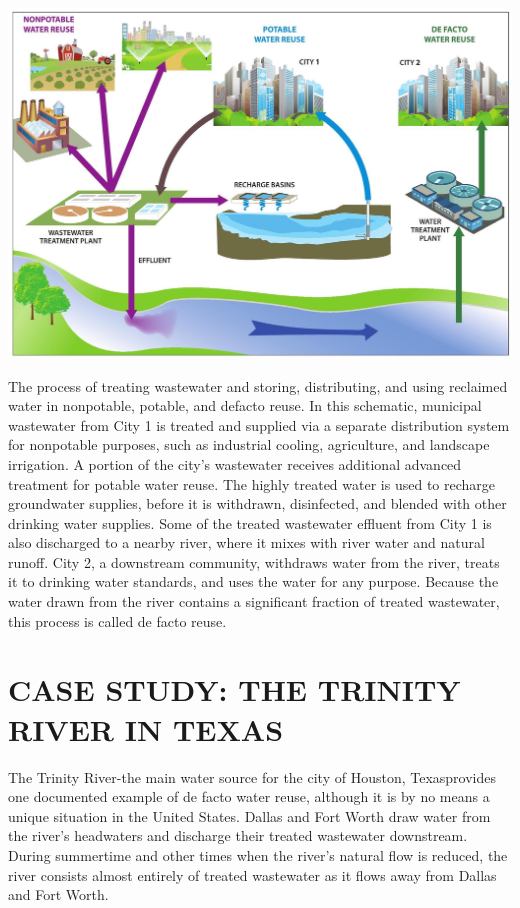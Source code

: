 \documentclass[10pt]{article}
\begin{document}
\includegraphics[max width=\textwidth]{2022_11_05_93277ca2de7ec5580550g-04}

The process of treating wastewater and storing, distributing, and using reclaimed water in nonpotable, potable, and defacto reuse. In this schematic, municipal wastewater from City 1 is treated and supplied via a separate distribution system for nonpotable purposes, such as industrial cooling, agriculture, and landscape irrigation. A portion of the city's wastewater receives additional advanced treatment for potable water reuse. The highly treated water is used to recharge groundwater supplies, before it is withdrawn, disinfected, and blended with other drinking water supplies. Some of the treated wastewater effluent from City 1 is also discharged to a nearby river, where it mixes with river water and natural runoff. City 2, a downstream community, withdraws water from the river, treats it to drinking water standards, and uses the water for any purpose. Because the water drawn from the river contains a significant fraction of treated wastewater, this process is called de facto reuse.

\section{CASE STUDY: THE TRINITY RIVER IN TEXAS}
The Trinity River-the main water source for the city of Houston, Texasprovides one documented example of de facto water reuse, although it is by no means a unique situation in the United States. Dallas and Fort Worth draw water from the river's headwaters and discharge their treated wastewater downstream. During summertime and other times when the river's natural flow is reduced, the river consists almost entirely of treated wastewater as it flows away from Dallas and Fort Worth.
\end{document}
